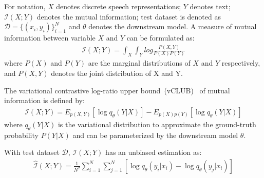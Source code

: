For notation, $X$ denotes discrete speech representations; $Y$ denotes text; $\mathcal{I}(X;Y)$ denotes the mutual information; test dataset is denoted as $\mathcal{D} =\{(x_i, y_i)\}_{i=1}^{N}$ and $\theta$ denotes the downstream model. 
A measure of mutual information between variable $X$ and $Y$ can be formulated as:
\begin{align*}
    \mathcal{I}(X;Y)=\int_{X}\int_{Y}log\frac{P(X,Y)}{P(X)P(Y)} 
\end{align*}
where $P(X)$ and $P(Y)$ are the marginal distributions of $X$ and $Y$
 respectively, and $P(X,Y)$ denotes the joint distribution of X and Y.
 
The variational contrastive log-ratio upper bound~(vCLUB)~\citep{cheng2020club} of mutual information is defined by:
\begin{align*}
    \mathcal{I}(X;Y)=E_{p(X,Y)}[\log q_{\theta}(Y|X)]
    -E_{p(X)p(Y)}[\log q_{\theta}(Y|X)]
\end{align*}
where $q_{\theta}(Y|X)$ is the variational distribution to approximate the ground-truth probability $P(Y|X)$ and can be parameterized by the downstream model $\theta$.

With test dataset $\mathcal{D}$, $\mathcal{I}(X;Y)$ has an unbiased estimation as:
\begin{align*}
    \mathcal{\hat{I}}(X;Y)=\frac{1}{N^2}\sum_{i=1}^{N}\sum_{j=1}^{N}[\log q_{\theta}(y_i|x_i)-\log q_{\theta}(y_j|x_i)]
\end{align*}